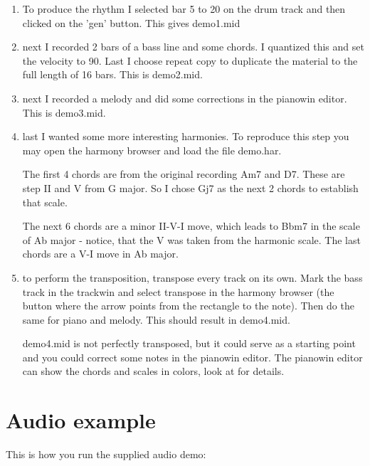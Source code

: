 \documentclass[letterpaper]{report}
\begin{document}
\begin{enumerate}
\item To produce the rhythm I selected bar 5 to 20 on the drum track and then
clicked on the 'gen' button. This gives demo1.mid

\item next I recorded 2 bars of a bass line and some chords. I quantized
this and set the velocity to 90. Last I choose repeat copy to duplicate
the material to the full length of 16 bars. This is demo2.mid.

\item next I recorded a melody and did some corrections in the pianowin editor.
This is demo3.mid.

\item last I wanted some more interesting harmonies. To reproduce this step
you may open the harmony browser and load the file demo.har.

The first 4 chords
are from the original recording Am7 and D7. These are step II and V from G major.
So I chose Gj7 as the next 2 chords to establish that scale.

The next 6 chords are a minor II-V-I move, which leads to Bbm7 in the
scale of Ab major - notice, that the V was taken from the harmonic scale.
The last chords are a V-I move in Ab major.


\item to perform the transposition, transpose every track on its own. Mark the
bass track in the trackwin and select transpose in the harmony browser (the button
where the arrow points from the rectangle to the note). Then do the same for
piano and melody. This should result in demo4.mid.

demo4.mid is not perfectly transposed, but it could serve as a starting point and
you could correct some notes in the pianowin editor. The pianowin editor can
show the chords and scales in colors, look at 
for details.

\end{enumerate}


\section{Audio example}\label{exaudio}

This is how you run the supplied audio demo:
\end{document}
